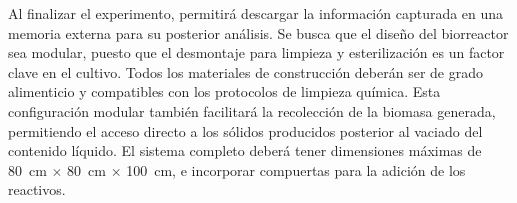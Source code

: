 Al finalizar el experimento, permitirá descargar la información capturada en una
memoria externa para su posterior análisis. Se busca que el diseño del biorreactor
sea modular, puesto que el desmontaje para limpieza y esterilización es un factor
clave en el cultivo. Todos los materiales de construcción deberán ser de grado
alimenticio y compatibles con los protocolos de limpieza química. Esta
configuración modular también facilitará la recolección de la biomasa generada,
permitiendo el acceso directo a los sólidos producidos posterior al vaciado del
contenido líquido. El sistema completo deberá tener dimensiones máximas de
80~cm $\times$ 80~cm $\times$ 100~cm, e incorporar compuertas para la adición de los reactivos.

